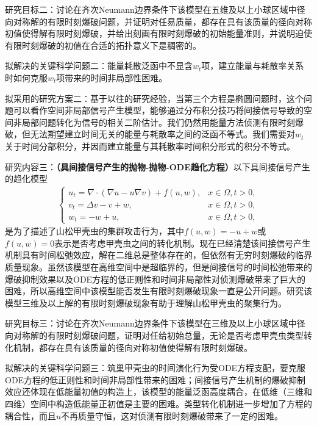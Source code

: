 \documentclass[12pt]{article}
\begin{document}
研究目标二：讨论在齐次Neumann边界条件下该模型在五维及以上小球区域中径向对称解的有限时刻爆破问题，并证明对任易质量，都存在具有该质量的径向对称初值使得解有限时刻爆破，并给出刻画有限时刻爆破的初始能量准则，并说明迫使有限时刻爆破的初值在合适的拓扑意义下是稠密的。

拟解决的关键科学问题二：能量耗散泛函中不显含$w_t$项，建立能量与耗散率关系时如何克服$w_t$项带来的时间非局部性困难。

拟采用的研究方案二：基于以往的研究经验，当第三个方程是椭圆问题时，这个问题可以看作空间非局部信号产生模型，能够通过分布积分技巧将间接信号导致的空间非局部问题转化为信号的相关二阶估计。我们仍然用能量方法侦测有限时刻爆破，但无法期望建立时间无关的能量与耗散率之间的泛函不等式。我们需要对$w_t$关于时间分部积分，并因而建立能量与其耗散率时间积分形式的积分不等式。

研究内容三：\textbf{（具间接信号产生的抛物-抛物-ODE趋化方程）}以下具间接信号产生的趋化模型
\begin{align}
    \begin{cases}
      \label{sys: ks isp ppodef}
        u_t =  \nabla\cdot(\nabla u - u\nabla v) + f(u,w),& x\in\Omega, t>0,\\
        v_t =  \Delta v - v + w,& x\in\Omega,	 t>0,\\
        w_t  = - w + u, & x\in\Omega, t > 0, 
    \end{cases}
\end{align}
是为了描述了山松甲壳虫的集群攻击行为，其中$f(u,w)=-u+w$或$f(u,w)=0$表示是否考虑甲壳虫之间的转化机制。现在已经清楚该间接信号产生机制具有时间松弛效应，解在二维总是整体存在的，但依然有无穷时刻爆破的临界质量现象。虽然该模型在高维空间中是超临界的，但是间接信号的时间松弛带来的爆破抑制效果以及ODE方程的低正则性和时间非局部性对侦测爆破带来了巨大的困难，所以高维空间中该模型能否发生有限时刻爆破现象一直是公开问题。研究该模型三维及以上解的有限时刻爆破现象有助于理解山松甲壳虫的聚集行为。

研究目标三：讨论在齐次Neumann边界条件下该模型在三维及以上小球区域中径向对称解的有限时刻爆破问题，证明对任给初始总量，无论是否考虑甲壳虫类型转化机制，都存在具有该质量的径向对称初值使得解有限时刻爆破。

拟解决的关键科学问题三：筑巢甲壳虫的时间演化行为受ODE方程支配，要克服ODE方程的低正则性和时间非局部性带来的困难；间接信号产生机制的爆破抑制效应还体现在低能量初值的构造上，该模型的能量泛函高度耦合，在低维（三维和四维）空间中构造低能量正初值是主要的困难。类型转化机制进一步增加了方程的耦合性，而且$u$不再质量守恒，这对侦测有限时刻爆破带来了一定的困难。
\end{document}
